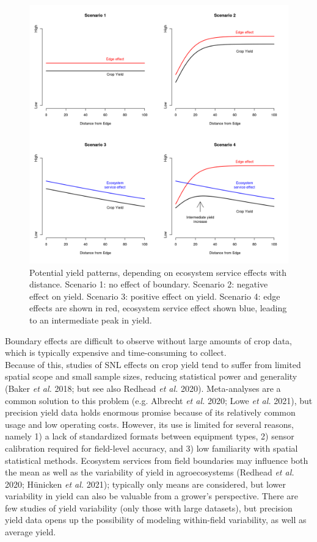 \documentclass[]{elsarticle} %
\begin{document}
\begin{figure}
\includegraphics[width=1\linewidth]{../Figures/ExamplePlots/hypotheses} \caption{Potential yield patterns, depending on ecosystem service effects with distance. Scenario 1: no effect of boundary. Scenario 2: negative effect on yield. Scenario 3: positive effect on yield. Scenario 4: edge effects are shown in red, ecosystem service effect shown blue, leading to an intermediate peak in yield.}\label{fig:hypotheses}
\end{figure}

Boundary effects are difficult to observe without large amounts of crop data, which is typically expensive and time-consuming to collect.\\
Because of this, studies of SNL effects on crop yield tend to suffer from limited spatial scope and small sample sizes, reducing statistical power and generality (Baker \emph{et al.} 2018; but see also Redhead \emph{et al.} 2020).
Meta-analyses are a common solution to this problem (e.g. Albrecht \emph{et al.} 2020; Lowe \emph{et al.} 2021), but precision yield data holds enormous promise because of its relatively common usage and low operating costs.
However, its use is limited for several reasons, namely 1) a lack of standardized formats between equipment types, 2) sensor calibration required for field-level accuracy, and 3) low familiarity with spatial statistical methods.
Ecosystem services from field boundaries may influence both the mean as well as the variability of yield in agroecosystems (Redhead \emph{et al.} 2020; Hünicken \emph{et al.} 2021); typically only means are considered, but lower variability in yield can also be valuable from a grower's perspective.
There are few studies of yield variability (only those with large datasets), but precision yield data opens up the possibility of modeling within-field variability, as well as average yield.
\end{document}
